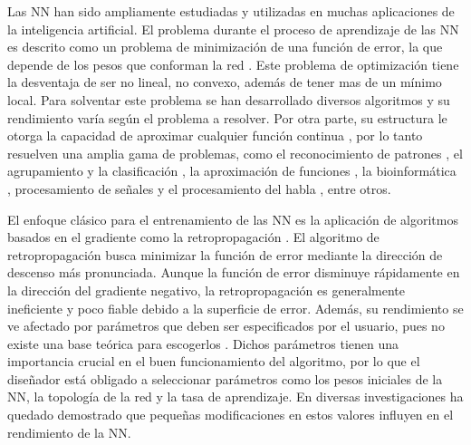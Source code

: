 Las NN han sido ampliamente estudiadas y utilizadas en muchas aplicaciones de la inteligencia artificial. El problema durante el proceso de aprendizaje de las NN es descrito como un problema de minimización de una función de error, la que depende de los pesos que conforman la red \cite{Rumelhart1986}. Este problema de optimización tiene la desventaja de ser no lineal, no convexo, además de tener mas de un mínimo local. Para solventar este problema se han desarrollado diversos algoritmos \cite{Grippo1994, Jacobs1988, Plagianakos2002, Rumelhart1986b, Plagianakos1998}  y su rendimiento varía según el problema a resolver. Por otra parte,  su estructura  le otorga la capacidad de aproximar cualquier función continua \cite{Hornik1991}, por lo tanto resuelven una amplia gama de problemas, como el reconocimiento de patrones \cite{Jain2000}, el agrupamiento y la clasificación \cite{Zhang2000}, la aproximación de funciones \cite{Selmic2002}, la bioinformática \cite{Mitra2006}, procesamiento de señales \cite{Hwang1997} y el procesamiento del habla \cite{Gorin1994}, entre otros.


El enfoque clásico para el entrenamiento de las NN es la aplicación de algoritmos basados en el gradiente como la retropropagación \cite{Rumelhart1986b}. El algoritmo de retropropagación busca minimizar la función de error mediante la dirección de descenso más pronunciada. Aunque la función de error disminuye rápidamente en la dirección del gradiente negativo, la retropropagación es generalmente ineficiente y poco fiable \cite{Gori1992} debido a la superficie de error. Además, su rendimiento se ve afectado por parámetros que deben ser especificados por el usuario, pues no existe una base teórica para escogerlos \cite{Nguyen1990}. Dichos parámetros tienen una importancia crucial en el buen funcionamiento del algoritmo, por lo que el diseñador está obligado a seleccionar parámetros como los pesos iniciales de la NN, la topología de la red y la tasa de aprendizaje. En diversas investigaciones \cite{Cauchy1847, Grippo1994, Plagianakos1998, Plagianakos2002} ha quedado demostrado que pequeñas modificaciones en estos valores influyen en el rendimiento de la NN.

